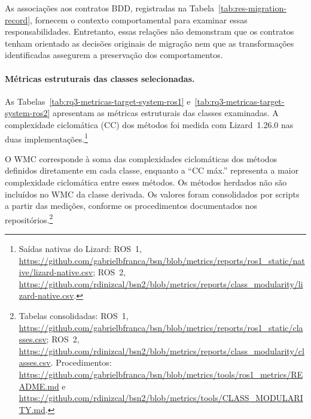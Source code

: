 As associações aos contratos BDD, registradas na Tabela~\ref{tab:res-migration-record}, fornecem o contexto comportamental para examinar essas responsabilidades. Entretanto, essas relações não demonstram que os contratos tenham orientado as decisões originais de migração nem que as transformações identificadas assegurem a preservação dos comportamentos.

\paragraph{Métricas estruturais das classes selecionadas.}

As Tabelas~\ref{tab:rq3-metricas-target-system-ros1} e~\ref{tab:rq3-metricas-target-system-ros2} apresentam as métricas estruturais das classes examinadas. A complexidade ciclomática (CC) dos métodos foi medida com Lizard~1.26.0 nas duas implementações.\footnote{Saídas nativas do Lizard: ROS~1, \url{https://github.com/gabrielbfranca/bsn/blob/metrics/reports/ros1_static/native/lizard-native.csv}; ROS~2, \url{https://github.com/rdinizcal/bsn2/blob/metrics/reports/class_modularity/lizard-native.csv}.}


O WMC corresponde à soma das complexidades ciclomáticas dos métodos definidos diretamente em cada classe, enquanto a ``CC máx.'' representa a maior complexidade ciclomática entre esses métodos. Os métodos herdados não são incluídos no WMC da classe derivada. Os valores foram consolidados por scripts a partir das medições, conforme os procedimentos documentados nos repositórios.\footnote{Tabelas consolidadas: ROS~1, \url{https://github.com/gabrielbfranca/bsn/blob/metrics/reports/ros1_static/classes.csv}; ROS~2, \url{https://github.com/rdinizcal/bsn2/blob/metrics/reports/class_modularity/classes.csv}. Procedimentos: \url{https://github.com/gabrielbfranca/bsn/blob/metrics/tools/ros1_metrics/README.md} e \url{https://github.com/rdinizcal/bsn2/blob/metrics/tools/CLASS_MODULARITY.md}.}

